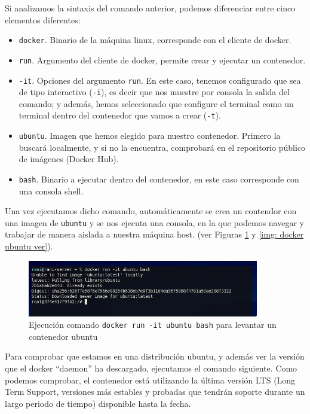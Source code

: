 \documentclass[a4paper, oneside, 12pt]{book}
\begin{document}
	\noindent Si analizamos la sintaxis del comando anterior, podemos diferenciar entre cinco elementos diferentes:
	\begin{itemize}
		\item \texttt{docker}. Binario de la máquina linux, corresponde con el cliente de docker.
		\item \texttt{run}. Argumento del cliente de docker, permite crear y ejecutar un contenedor.
		\item \texttt{-it}. Opciones del argumento \texttt{run}. En este caso, tenemos configurado que sea de tipo interactivo (\texttt{-i}), es decir que nos muestre por consola la salida del comando; y además, hemos seleccionado que configure el terminal como un terminal dentro del contenedor que vamos a crear (\texttt{-t}).
		\item \texttt{ubuntu}. Imagen que hemos elegido para nuestro contenedor. Primero la buscará localmente, y si no la encuentra, comprobará en el repositorio público de imágenes (Docker Hub).
		\item \texttt{bash}. Binario a ejecutar dentro del contenedor, en este caso corresponde con una consola shell.
	\end{itemize}

	\noindent Una vez ejecutamos dicho comando, automáticamente se crea un contendor con una imagen de \texttt{ubuntu} y se nos ejecuta una consola, en la que podemos navegar y trabajar de manera aislada a nuestra máquina host. (ver Figuras \ref{img: docker ubuntu} y \ref{img: docker ubuntu ver}).
	
	\pagebreak
	
	\begin{figure}[h]
		\begin{center}
			\includegraphics[width=0.9\textwidth]{img/docker_ubuntu.png}
			\caption{Ejecución comando \texttt{docker run -it ubuntu bash} para levantar un contenedor ubuntu}
			\label{img: docker ubuntu}
		\end{center}
	\end{figure}


	\noindent Para comprobar que estamos en una distribución ubuntu, y además ver la versión que el docker ``daemon'' ha descargado, ejecutamos el comando siguiente. Como podemos comprobar, el contenedor está utilizando la última versión LTS (Long Term Support, versiones más estables y probadas que tendrán soporte durante un largo periodo de tiempo) disponible hasta la fecha.
	
\end{document}
